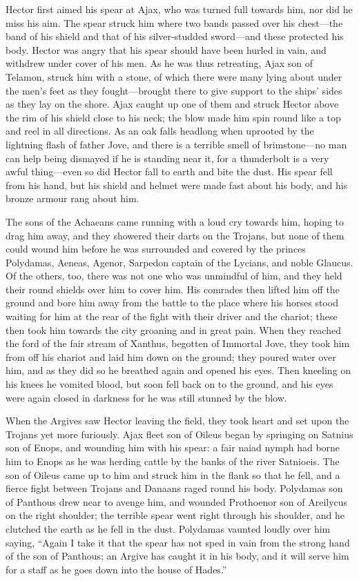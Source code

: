 Hector first aimed his spear at Ajax, who was turned full towards him, nor
did he miss his aim. The spear struck him where two bands passed over his
chest—the band of his shield and that of his silver-studded sword—and
these protected his body. Hector was angry that his spear should have been
hurled in vain, and withdrew under cover of his men. As he was thus
retreating, Ajax son of Telamon, struck him with a stone, of which there
were many lying about under the men’s feet as they fought—brought
there to give support to the ships’ sides as they lay on the shore. Ajax
caught up one of them and struck Hector above the rim of his shield close
to his neck; the blow made him spin round like a top and reel in all
directions. As an oak falls headlong when uprooted by the lightning flash
of father Jove, and there is a terrible smell of brimstone—no man
can help being dismayed if he is standing near it, for a thunderbolt is a
very awful thing—even so did Hector fall to earth and bite the dust.
His spear fell from his hand, but his shield and helmet were made fast
about his body, and his bronze armour rang about him.

The sons of the Achaeans came running with a loud cry towards him, hoping
to drag him away, and they showered their darts on the Trojans, but none
of them could wound him before he was surrounded and covered by the
princes Polydamas, Aeneas, Agenor, Sarpedon captain of the Lycians, and
noble Glaucus. Of the others, too, there was not one who was unmindful of
him, and they held their round shields over him to cover him. His comrades
then lifted him off the ground and bore him away from the battle to the
place where his horses stood waiting for him at the rear of the fight with
their driver and the chariot; these then took him towards the city
groaning and in great pain. When they reached the ford of the fair stream
of Xanthus, begotten of Immortal Jove, they took him from off his chariot
and laid him down on the ground; they poured water over him, and as they
did so he breathed again and opened his eyes. Then kneeling on his knees
he vomited blood, but soon fell back on to the ground, and his eyes were
again closed in darkness for he was still stunned by the blow.

When the Argives saw Hector leaving the field, they took heart and set
upon the Trojans yet more furiously. Ajax fleet son of Oileus began by
springing on Satnius son of Enops, and wounding him with his spear: a fair
naiad nymph had borne him to Enops as he was herding cattle by the banks
of the river Satnioeis. The son of Oileus came up to him and struck him in
the flank so that he fell, and a fierce fight between Trojans and Danaans
raged round his body. Polydamas son of Panthous drew near to avenge him,
and wounded Prothoenor son of Areilycus on the right shoulder; the
terrible spear went right through his shoulder, and he clutched the earth
as he fell in the dust. Polydamas vaunted loudly over him saying, “Again I
take it that the spear has not sped in vain from the strong hand of the
son of Panthous; an Argive has caught it in his body, and it will serve
him for a staff as he goes down into the house of Hades.”

